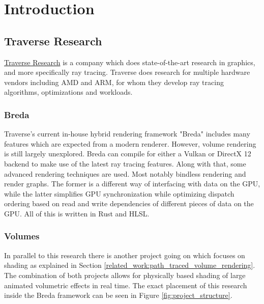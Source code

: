 \section{Introduction} \label{introduction}








\clearpage\subsection{Traverse Research} \label{introduction:traverse_research}
\href{https://traverseresearch.nl/}{Traverse Research} is a company which does state-of-the-art research in graphics, and more specifically ray tracing. Traverse does research for multiple hardware vendors including AMD and ARM, for whom they develop ray tracing algorithms, optimizations and workloads.
\subsubsection{Breda} \label{introduction:traverse_research:breda}
Traverse's current in-house hybrid rendering framework "Breda" includes many features which are expected from a modern renderer. However, volume rendering is still largely unexplored. Breda can compile for either a Vulkan or DirectX 12 backend to make use of the latest ray tracing features. Along with that, some advanced rendering techniques are used. Most notably bindless rendering\cite{BindlessRenderingSetup} and render graphs\cite{RenderGraph101}. The former is a different way of interfacing with data on the GPU, while the latter simplifies GPU synchronization while optimizing dispatch ordering based on read and write dependencies of different pieces of data on the GPU. All of this is written in Rust and HLSL.
\subsubsection{Volumes} \label{introduction:traverse_research:volumes}
In parallel to this research there is another project going on which focuses on shading as explained in Section \ref{related_work:path_traced_volume_rendering}. The combination of both projects allows for physically based shading of large animated volumetric effects in real time. The exact placement of this research inside the Breda framework can be seen in Figure \ref{fig:project_structure}.

